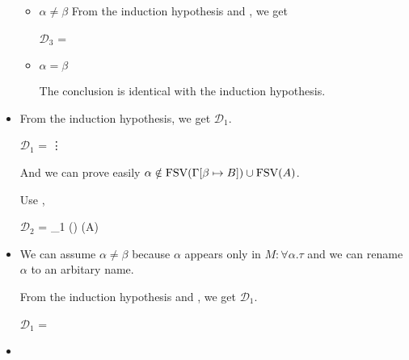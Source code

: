 \begin{itemize}
	      \begin{itemize}
	      		      		      	
	      	\item $\alpha \neq \beta$
	      	      From the induction hypothesis and \TTBL, we get
	      	      	      	      	      	      
	      	      $\mathcal{D}_3$ = 
	      	      {
	      	      }
	      	      	      	      	      	      
	      	\item $\alpha = \beta$
	      	      	      	      	      	      
	      	      The conclusion is identical with the induction hypothesis.
	      	      	      	      	      	      
	      \end{itemize}
	      	      	      
	\item \TGen
	      	      	      
	      From the induction hypothesis, we get $\mathcal{D}_1$.
	      	      	      
	      $\mathcal{D}_1$ = 
	      {\vdots}
	      	      	      
	      And we can prove easily $\alpha \notin \text{FSV}(\Gamma[\beta \mapsto B]) \cup \text{FSV}(A)$.
	      	      	      
	      Use \TGen,
	      	      	      
	      $\mathcal{D}_2$ = 
	      {_1 \andalso \alpha \notin \FTV(\GG) \cup \FTV(A)}
	      	      	      
	\item \TIns
	      	      	      
	      We can assume $\alpha \neq \beta$ because $\alpha$ appears only in $M:\forall\alpha.\tau$ and we can rename $\alpha$ to an arbitary name.
	      	      	      
	      From the induction hypothesis and \TIns, we get $\mathcal{D}_1$.
	      	      	      
	      $\mathcal{D}_1$ = 
	      {}
	      	      	      
	\item \TCsp
	      	      	      

\end{itemize}
